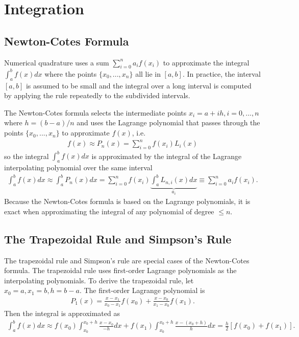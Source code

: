 \documentclass{revtex4-2}
\theoremstyle{definition}
\begin{document}
\section{Integration}

\subsection{Newton-Cotes Formula}

Numerical quadrature uses a sum $\sum_{i=0}^n a_i f(x_i)$ to approximate the integral $\int_a^b f(x) dx$ where the 
points $\{x_0, ..., x_n\}$ all lie in $[a, b]$. In practice, the interval $[a, b]$ is assumed to be small and the 
integral over a long interval is computed by applying the rule repeatedly to the subdivided intervals.

The Newton-Cotes formula selects the intermediate points $x_i = a + ih, i = 0, ..., n$ where $h = (b - a) / n$ and 
uses the Lagrange polynomial that passes through the points $\{x_0, ..., x_n\}$ to
approximate $f(x)$, i.e.
\begin{align}
    f(x) \approx P_n(x) = \sum_{i=0}^n f(x_i) L_i(x)
\end{align}
so the integral $\int_a^b f(x) dx$ is approximated by the integral of the Lagrange interpolating polynomial over the
same interval
\begin{align}
    \int_a^b f(x) dx \approx \int_a^b P_n(x) dx = \sum_{i=0}^n f(x_i) \underbrace{\int_a^b L_{n, i}(x) dx}_{a_i} 
    \equiv \sum_{i=0}^n a_i f(x_i).
\end{align}
Because the Newton-Cotes formula is based on the Lagrange polynomials, it is exact when approximating the integral of
any polynomial of degree $\leq n$.

\subsection{The Trapezoidal Rule and Simpson's Rule}

The trapezoidal rule and Simpson's rule are special cases of the Newton-Cotes formula. The trapezoidal rule uses 
first-order Lagrange polynomials as the interpolating polynomials. To derive the trapezoidal rule, let 
$x_0 = a, x_1 = b, h = b - a$. The first-order Lagrange polynomial is
\begin{align}
    P_1(x) = \frac{x - x_1}{x_0 - x_1} f(x_0) + \frac{x - x_0}{x_1 - x_0} f(x_1).
\end{align}
Then the integral is approximated as
\begin{align}
    \int_a^b f(x) dx \approx f(x_0)\int_{x_0}^{x_0+h}\frac{x-x_0}{-h} dx + 
    f(x_1)\int_{x_0}^{x_0+h} \frac{x-(x_0+h)}{h} dx = \frac{h}{2}[f(x_0) + f(x_1)].
\end{align}
\end{document}
